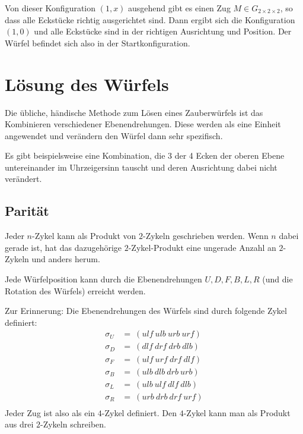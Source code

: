 \documentclass[12pt,a4paper, usenames, dvipsnames]{article}
\newcommand{\Gtwo}{\ensuremath{G_{2\times 2\times 2}}}
\begin{document}
Von dieser Konfiguration $(1,x)$ ausgehend gibt es einen Zug $M \in \Gtwo$, so dass alle Eckstücke richtig ausgerichtet sind. Dann ergibt sich die Konfiguration $(1, 0)$ und alle Eckstücke sind in der richtigen Ausrichtung und Position. Der Würfel befindet sich also in der Startkonfiguration. 
%
%
%
%
%
%
%
%
%
%
%
%
%
%
%
%
%
%
%
%
\newpage


\section{Lösung des Würfels}

Die übliche, händische Methode zum Lösen eines Zauberwürfels ist das Kombinieren verschiedener Ebenendrehungen. Diese werden als eine Einheit angewendet und verändern den Würfel dann sehr spezifisch. 


Es gibt beispielsweise eine Kombination, die 3 der 4 Ecken der oberen Ebene untereinander im Uhrzeigersinn tauscht und deren Ausrichtung dabei nicht verändert. 

%
%
%
%
%
%
%
%
%
%
%
%
%
%
%
%
%
%
%
%
\subsection*{Parität}

Jeder $n$-Zykel kann als Produkt von $2$-Zykeln geschrieben werden. Wenn $n$ dabei gerade ist, hat das dazugehörige $2$-Zykel-Produkt eine ungerade Anzahl an $2$-Zykeln und anders herum. \cite{TD}


Jede Würfelposition kann durch die Ebenendrehungen $U, D, F, B, L, R$ (und die Rotation des Würfels) erreicht werden. 


Zur Erinnerung: Die Ebenendrehungen des Würfels sind durch folgende Zykel definiert:
\begin{align*}
\sigma_U & =\ (ulf \ ulb \ urb \ urf) \\
\sigma_D & =\ (dlf \ drf \ drb \ dlb) \\
\sigma_F & =\ (ulf \ urf \ drf \ dlf) \\
\sigma_B & =\ (ulb \ dlb \ drb \ urb) \\
\sigma_L & =\ (ulb \ ulf \ dlf \ dlb) \\
\sigma_R & =\ (urb \ drb \ drf \ urf) \\
\end{align*}
Jeder Zug ist also als ein $4$-Zykel definiert. Den $4$-Zykel kann man als Produkt aus drei $2$-Zykeln schreiben. 
\end{document}
